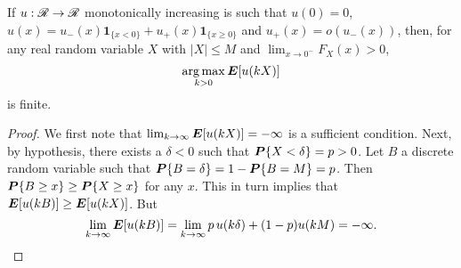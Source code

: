 \begin{claim}
  \label{claim_finite}
  If $u:\mathscr{R}\to\mathscr{R}$ monotonically increasing is such that $u(0) = 0$,
  $u(x) = u_-(x)\bm1_{\{x<0\}}+u_+(x)\bm 1_{\{x\geq 0\}}$ and $u_+(x) = o(u_-(x))$, then,
  for any real random variable $X$ with $|X|\leq M$ and $\lim_{x\to0^-}F_X(x)>0$,
  \begin{equation*}
    \operatorname*{arg\,max}_{k>0} \bm E[u(kX)]
  \end{equation*}
  is finite.
\end{claim}
\begin{proof}
  We first note that $\lim_{k\to\infty} \bm E[u(kX)]=-\infty$ is a sufficient condition. Next,
  by hypothesis, there exists a $\delta<0$ such that $\bm P\{X<\delta\}=p>0$. Let $B$ a
  discrete random variable such that $\bm P\{B=\delta\}=1-\bm P\{B=M\}=p$. Then $\bm P\{B\geq
  x\}\geq\bm P\{X\geq x\}$ for any $x$. This in turn implies that
  $\bm E[u(kB)]\geq\bm E[u(kX)]$. But 
  \begin{equation*}
    \lim_{k\to\infty}\bm E[u(kB)] = \lim_{k\to\infty}p\,u(k\delta)+(1-p)u(kM) = -\infty.\qedhere
  \end{equation*}
\end{proof}

